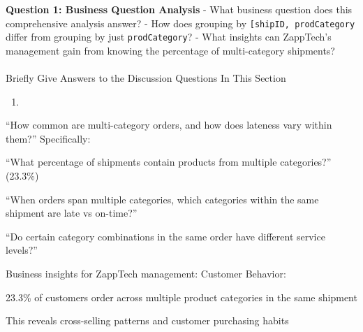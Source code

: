 \documentclass[
  letterpaper,
  DIV=11,
  numbers=noendperiod]{scrartcl}
\makeatletter
\let\oldparagraph\paragraph
\renewcommand{\paragraph}{
    \@ifstar
      \xxxParagraphStar
      \xxxParagraphNoStar
  }
\newcommand{\xxxParagraphStar}[1]{\oldparagraph*{#1}\mbox{}}
\newcommand{\xxxParagraphNoStar}[1]{\oldparagraph{#1}\mbox{}}
\providecommand{\tightlist}{%
  \setlength{\itemsep}{0pt}\setlength{\parskip}{0pt}}
\makeatother
\begin{document}
\begin{tcolorbox}[enhanced jigsaw, toptitle=1mm, opacityback=0, colframe=quarto-callout-important-color-frame, leftrule=.75mm, arc=.35mm, opacitybacktitle=0.6, breakable, titlerule=0mm, coltitle=black, bottomtitle=1mm, title=\textcolor{quarto-callout-important-color}{\faExclamation}\hspace{0.5em}{🤔 Discussion Questions: Answering A Business Question}, colbacktitle=quarto-callout-important-color!10!white, rightrule=.15mm, left=2mm, bottomrule=.15mm, toprule=.15mm, colback=white]

\textbf{Question 1: Business Question Analysis} - What business question
does this comprehensive analysis answer? - How does grouping by
\texttt{{[}\textquotesingle{}shipID\textquotesingle{},\ \textquotesingle{}prodCategory\textquotesingle{}{]}}
differ from grouping by just
\texttt{\textquotesingle{}prodCategory\textquotesingle{}}? - What
insights can ZappTech's management gain from knowing the percentage of
multi-category shipments?

\end{tcolorbox}

\paragraph{Briefly Give Answers to the Discussion Questions In This
Section}\label{briefly-give-answers-to-the-discussion-questions-in-this-section-7}

\begin{enumerate}
\def\labelenumi{\arabic{enumi}.}
\tightlist
\item
\end{enumerate}

``How common are multi-category orders, and how does lateness vary
within them?'' Specifically:

``What percentage of shipments contain products from multiple
categories?'' (23.3\%)

``When orders span multiple categories, which categories within the same
shipment are late vs on-time?''

``Do certain category combinations in the same order have different
service levels?''

Business insights for ZappTech management: Customer Behavior:

23.3\% of customers order across multiple product categories in the same
shipment

This reveals cross-selling patterns and customer purchasing habits
\end{document}
